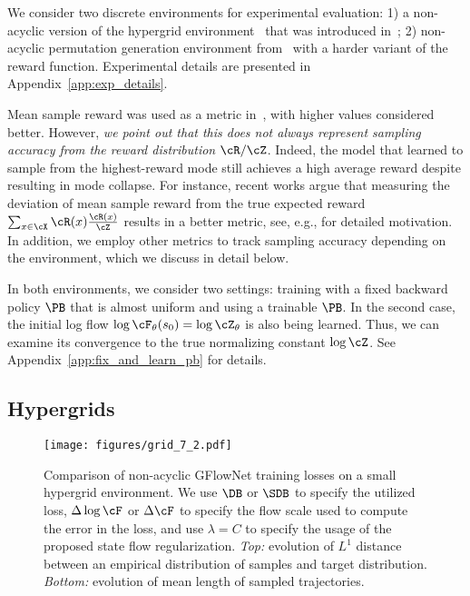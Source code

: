 We consider two discrete environments for experimental evaluation: 1) a non-acyclic version of the hypergrid environment~\cite{bengio2021flow} that was introduced in~\cite{brunswic2024theory}; 2) non-acyclic permutation generation environment from~\cite{brunswic2024theory} with a harder variant of the reward function. Experimental details are presented in Appendix~\ref{app:exp_details}.

Mean sample reward was used as a metric in~\cite{brunswic2024theory}, with higher values considered better. However, \textit{we point out that this does not always represent sampling accuracy from the reward distribution $\cR/\cZ$}. Indeed, the model that learned to sample from the highest-reward mode still achieves a high average reward despite resulting in mode collapse. For instance, recent works argue that measuring the deviation of mean sample reward from the true expected reward $\sum_{x \in \cX} \cR(x) \frac{\cR(x)}{\cZ}$ results in a better metric, see, e.g., \cite{shen2023towards} for detailed motivation. In addition, we employ other metrics to track sampling accuracy depending on the environment, which we discuss in detail below. 

In both environments, we consider two settings: training with a fixed backward policy $\PB$ that is almost uniform and using a trainable $\PB$. In the second case, the initial log flow $\log \cF_{\theta}(s_0) = \log \cZ_{\theta}$ is also being learned. Thus, we can examine its convergence to the true normalizing constant $\log \cZ$. See Appendix~\ref{app:fix_and_learn_pb} for details.


\subsection{Hypergrids}
\label{sec:grids}

\begin{figure}[t!]

  \centering
    \texttt{[image: figures/grid\_7\_2.pdf]} 

  \caption{Comparison of non-acyclic GFlowNet training losses on a small hypergrid environment. We use $\DB$ or $\SDB$ to specify the utilized loss, $\Delta \log \cF$ or $\Delta \cF$ to specify the flow scale used to compute the error in the loss, and use $\lambda = C$ to specify the usage of the proposed state flow regularization. \textit{Top:} evolution of $L^1$ distance between an empirical distribution of samples and target distribution. \textit{Bottom:} evolution of mean length of sampled trajectories.}\label{fig:mol_results}
\label{fig:small_grid}

\end{figure}



